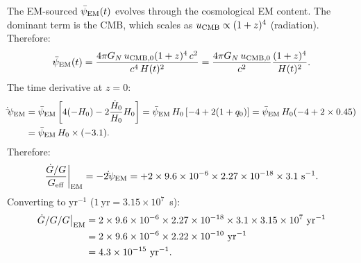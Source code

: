 \documentclass[11pt]{article}
\newcommand{\ee}[1]{\times 10^{#1}}
\newcommand{\psiEM}{\bar{\psi}_{\rm EM}}
\newcommand{\GN}{G_N}
\newcommand{\Geff}{G_{\rm eff}}
\newcommand{\Gdot}{\dot{G}/G}
\begin{document}
The EM-sourced $\psiEM(t)$ evolves through the cosmological EM content.
The dominant term is the CMB, which scales as $u_{\rm CMB} \propto (1+z)^4$
(radiation). Therefore:
\begin{equation}
  \psiEM(t) = \frac{4\pi \GN\,u_{\rm CMB,0}(1+z)^4\,c^2}{c^4\,H(t)^2}
  = \frac{4\pi \GN\,u_{\rm CMB,0}}{c^2}\frac{(1+z)^4}{H(t)^2}.
\end{equation}
The time derivative at $z = 0$:
\begin{align}
  \dot\psiEM &= \psiEM\left[4(-H_0) - 2\frac{\dot H_0}{H_0}H_0\right]
  = \psiEM\,H_0\left[-4 + 2(1+q_0)\right]
  = \psiEM\,H_0(-4 + 2\times 0.45) \nonumber\\
  &= \psiEM\,H_0\times(-3.1).
\end{align}
Therefore:
\begin{equation}\label{eq:Gdot-EM}
  \frac{\Gdot}{\Geff}\bigg|_{\rm EM} = -2\dot\psiEM
  = +2\times 9.6\ee{-6}\times 2.27\ee{-18}\times 3.1
  ~\text{s}^{-1}.
\end{equation}
Converting to yr$^{-1}$ ($1~\text{yr} = 3.15\ee{7}$~s):
\begin{align}
  \Gdot/G\big|_{\rm EM} &= 2\times 9.6\ee{-6}\times 2.27\ee{-18}\times 3.1
    \times 3.15\ee{7}~\text{yr}^{-1} \nonumber\\
  &= 2\times 9.6\ee{-6}\times 2.22\ee{-10}~\text{yr}^{-1} \nonumber\\
  &= 4.3\ee{-15}~\text{yr}^{-1}.
\end{align}
\end{document}
